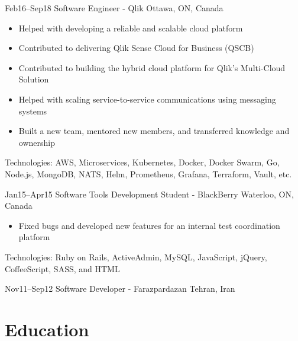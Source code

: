 \documentclass[]{cv-style}                     %
\begin{document}
\begin{entrylist}
  \entry
  {\small Feb16--Sep18}
  {Software Engineer - Qlik}
  {Ottawa, ON, Canada}
  {
    \begin{itemize}
      \item Helped with developing a reliable and scalable cloud platform
      \item Contributed to delivering Qlik Sense Cloud for Business (QSCB)
      \item Contributed to building the hybrid cloud platform for Qlik's Multi-Cloud Solution
      \item Helped with scaling service-to-service communications using messaging systems
      \item Built a new team, mentored new members, and transferred knowledge and ownership
    \end{itemize}
    Technologies: AWS, Microservices, Kubernetes, Docker, Docker Swarm, Go, Node.js, MongoDB, NATS, Helm, Prometheus, Grafana, Terraform, Vault, etc.
   }

  \entry
  {\small Jan15--Apr15}
  {Software Tools Development Student - BlackBerry}
  {Waterloo, ON, Canada}
  {
    \begin{itemize}
      \item Fixed bugs and developed new features for an internal test coordination platform
    \end{itemize}
    Technologies: Ruby on Rails, ActiveAdmin, MySQL, JavaScript, jQuery, CoffeeScript, SASS, and HTML
  }

  \entry
  {\small Nov11--Sep12}
  {Software Developer - Farazpardazan}
  {Tehran, Iran}
  {}


\end{entrylist}



\section{Education}
\end{document}
